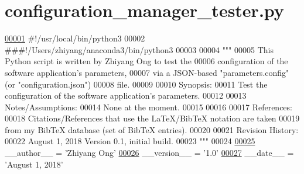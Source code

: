 \hypertarget{configuration__manager__tester_8py_source}{}\section{configuration\+\_\+manager\+\_\+tester.\+py}
\label{configuration__manager__tester_8py_source}

\begin{DoxyCode}
\hypertarget{configuration__manager__tester_8py_source_l00001}{}\hyperlink{namespaceutilities_1_1configuration__manager__tester}{00001} \textcolor{comment}{#!/usr/local/bin/python3}
00002 \textcolor{comment}{###!/Users/zhiyang/anaconda3/bin/python3}
00003 
00004 \textcolor{stringliteral}{"""}
00005 \textcolor{stringliteral}{    This Python script is written by Zhiyang Ong to test the}
00006 \textcolor{stringliteral}{        configuration of the software application's parameters,}
00007 \textcolor{stringliteral}{        via a JSON-based "parameters.config" (or "configuration.json")}
00008 \textcolor{stringliteral}{        file.}
00009 \textcolor{stringliteral}{}
00010 \textcolor{stringliteral}{    Synopsis:}
00011 \textcolor{stringliteral}{    Test the configuration of the software application's parameters.}
00012 \textcolor{stringliteral}{}
00013 \textcolor{stringliteral}{    Notes/Assumptions:}
00014 \textcolor{stringliteral}{    None at the moment.}
00015 \textcolor{stringliteral}{}
00016 \textcolor{stringliteral}{}
00017 \textcolor{stringliteral}{    References:}
00018 \textcolor{stringliteral}{    Citations/References that use the LaTeX/BibTeX notation are taken}
00019 \textcolor{stringliteral}{        from my BibTeX database (set of BibTeX entries).}
00020 \textcolor{stringliteral}{}
00021 \textcolor{stringliteral}{    Revision History:}
00022 \textcolor{stringliteral}{    August 1, 2018          Version 0.1, initial build.}
00023 \textcolor{stringliteral}{"""}
00024 
\hypertarget{configuration__manager__tester_8py_source_l00025}{}\hyperlink{namespaceutilities_1_1configuration__manager__tester_aa6fa7c3492580a61698b531deb1df918}{00025} \_\_author\_\_ = \textcolor{stringliteral}{'Zhiyang Ong'}
\hypertarget{configuration__manager__tester_8py_source_l00026}{}\hyperlink{namespaceutilities_1_1configuration__manager__tester_a5106d1471e1cb4d2b0f14486768f1096}{00026} \_\_version\_\_ = \textcolor{stringliteral}{'1.0'}
\hypertarget{configuration__manager__tester_8py_source_l00027}{}\hyperlink{namespaceutilities_1_1configuration__manager__tester_ac13eba5bd97c2c6945d9195a63f2ee1b}{00027} \_\_date\_\_ = \textcolor{stringliteral}{'August 1, 2018'}

\end{DoxyCode}
